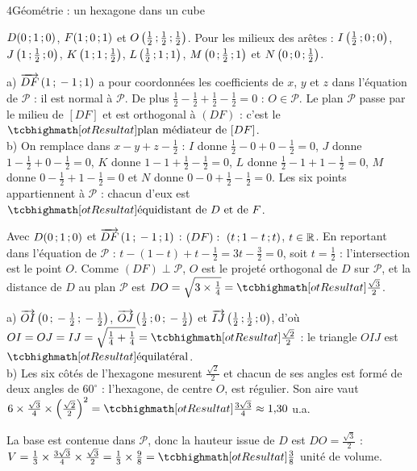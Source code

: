 \begin{corrigeBac}{4}{Géométrie : un hexagone dans un cube}
\begin{questions}
  \item $D(0\,{;}\,1\,{;}\,0)$, $F(1\,{;}\,0\,{;}\,1)$ et $O\left(\frac12\,{;}\,\frac12\,{;}\,\frac12\right)$. Pour les milieux des arêtes :
    $I\left(\frac12\,{;}\,0\,{;}\,0\right)$, $J\left(1\,{;}\,\frac12\,{;}\,0\right)$, $K\left(1\,{;}\,1\,{;}\,\frac12\right)$, $L\left(\frac12\,{;}\,1\,{;}\,1\right)$,
    $M\left(0\,{;}\,\frac12\,{;}\,1\right)$ et $N\left(0\,{;}\,0\,{;}\,\frac12\right)$. 
  \item a) $\overrightarrow{DF}\,(1\,{;}\,-1\,{;}\,1)$ a pour coordonnées les coefficients de $x$, $y$ et $z$ dans l'équation de $\mathcal{P}$ : il est normal
    à $\mathcal{P}$. De plus $\frac12-\frac12+\frac12-\frac12=0$ : $O\in\mathcal{P}$. Le plan $\mathcal{P}$ passe par le milieu de $[DF]$ et
    est orthogonal à $(DF)$ : c'est le $\res{\text{plan médiateur de }[DF]}$.\\
    b) On remplace dans $x-y+z-\frac12$ : $I$ donne $\frac12-0+0-\frac12=0$, $J$ donne $1-\frac12+0-\frac12=0$, $K$ donne
    $1-1+\frac12-\frac12=0$, $L$ donne $\frac12-1+1-\frac12=0$, $M$ donne $0-\frac12+1-\frac12=0$ et $N$ donne $0-0+\frac12-\frac12=0$. Les
    six points appartiennent à $\mathcal{P}$ : chacun d'eux est $\res{\text{équidistant de }D\text{ et de }F}$. \pts{1 pt}
  \item Avec $D(0\,{;}\,1\,{;}\,0)$ et $\overrightarrow{DF}\,(1\,{;}\,-1\,{;}\,1)$ : $(DF):\ (t\,{;}\,1-t\,{;}\, t)$, $t\in\mathbb{R}$. En reportant dans l'équation de $\mathcal{P}$ :
    $t-(1-t)+t-\frac12=3t-\frac32=0$, soit $t=\frac12$ : l'intersection est le point $O$. Comme $(DF)\perp\mathcal{P}$, $O$ est le projeté
    orthogonal de $D$ sur $\mathcal{P}$, et la distance de $D$ au plan $\mathcal{P}$ est $DO=\sqrt{3\times\frac14}=\res{\tfrac{\sqrt3}{2}}$. 
  \item a) $\overrightarrow{OI}\left(0\,{;}\,-\frac12\,{;}\,-\frac12\right)$, $\overrightarrow{OJ}\left(\frac12\,{;}\,0\,{;}\,-\frac12\right)$ et $\overrightarrow{IJ}\left(\frac12\,{;}\,\frac12\,{;}\,0\right)$,
    d'où $OI=OJ=IJ=\sqrt{\frac14+\frac14}=\res{\tfrac{\sqrt2}{2}}$ : le triangle $OIJ$ est $\res{\text{équilatéral}}$.\\
    b) Les six côtés de l'hexagone mesurent $\frac{\sqrt2}{2}$ et chacun de ses angles est formé de deux angles de $60^\circ$ : l'hexagone,
    de centre $O$, est régulier. Son aire vaut $6\times\frac{\sqrt3}{4}\times\left(\frac{\sqrt2}{2}\right)^{2}=\res{\tfrac{3\sqrt3}{4}}\approx1{,}30$ u.a. \pts{1 pt}
  \item La base est contenue dans $\mathcal{P}$, donc la hauteur issue de $D$ est $DO=\frac{\sqrt3}{2}$ :
    $V=\frac13\times\frac{3\sqrt3}{4}\times\frac{\sqrt3}{2}=\frac13\times\frac98=\res{\tfrac38}$ unité de volume. 
\end{questions}
\end{corrigeBac}

